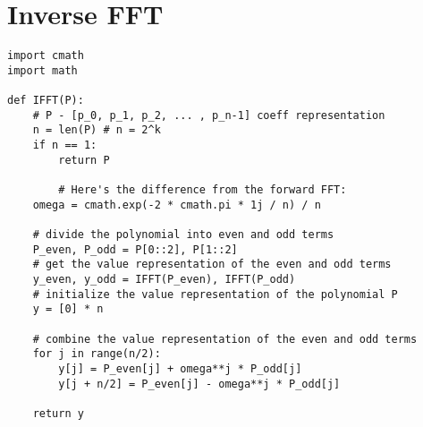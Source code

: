 \documentclass{report}
\begin{document}
\section{Inverse FFT} 

\begin{verbatim}
import cmath
import math

def IFFT(P):
	# P - [p_0, p_1, p_2, ... , p_n-1] coeff representation
	n = len(P) # n = 2^k
	if n == 1:
		return P

        # Here's the difference from the forward FFT:
	omega = cmath.exp(-2 * cmath.pi * 1j / n) / n

	# divide the polynomial into even and odd terms
	P_even, P_odd = P[0::2], P[1::2]
	# get the value representation of the even and odd terms
	y_even, y_odd = IFFT(P_even), IFFT(P_odd)
	# initialize the value representation of the polynomial P
	y = [0] * n

	# combine the value representation of the even and odd terms
	for j in range(n/2):
		y[j] = P_even[j] + omega**j * P_odd[j]
		y[j + n/2] = P_even[j] - omega**j * P_odd[j]

	return y
\end{verbatim}
\end{document}
